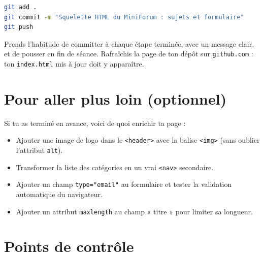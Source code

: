 \documentclass[a4paper,11pt]{article}
\begin{document}
\begin{lstlisting}[language=bash]
git add .
git commit -m "Squelette HTML du MiniForum : sujets et formulaire"
git push
\end{lstlisting}

\begin{tcolorbox}[astuce, title={Le bon réflexe}]
Prends l'habitude de committer à chaque étape terminée, avec un message clair, et de pousser en fin de séance. Rafraîchis la page de ton dépôt sur \texttt{github.com} : ton \texttt{index.html} mis à jour doit y apparaître.
\end{tcolorbox}

\section{Pour aller plus loin (optionnel)}

Si tu as terminé en avance, voici de quoi enrichir ta page :

\begin{itemize}
  \item Ajouter une image de logo dans le \texttt{<header>} avec la balise \texttt{<img>} (sans oublier l'attribut \texttt{alt}).
  \item Transformer la liste des catégories en un vrai \texttt{<nav>} secondaire.
  \item Ajouter un champ \texttt{type="email"} au formulaire et tester la validation automatique du navigateur.
  \item Ajouter un attribut \texttt{maxlength} au champ « titre » pour limiter sa longueur.
\end{itemize}

\section{Points de contrôle}
\end{document}
